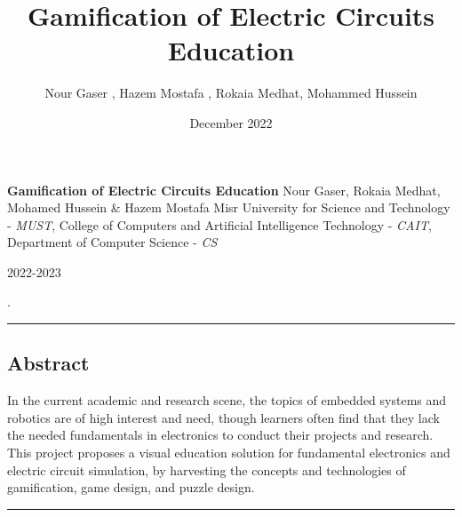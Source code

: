\documentclass[twoside,a4paper,11pt]{article}
\title{Gamification of Electric
 Circuits Education}
\author{Nour Gaser , Hazem Mostafa , Rokaia Medhat, Mohammed Hussein  }
\date{December 2022}
\begin{document}
\begin{center}
\LARGE
\textbf{Gamification of Electric Circuits Education}
\newline
\hfill \break
\large
Nour Gaser, Rokaia Medhat, Mohamed Hussein \& Hazem Mostafa
 \newline
\hfill \break
\normalsize
Misr University for Science and Technology -\textit{ MUST}, College of Computers and Artificial Intelligence Technology - \textit{CAIT}, Department of Computer Science - \textit{CS}

\hfill \break
\normalsize
\large 2022-2023   
\end{center}
\pagestyle{fancy}
\setlength{\headheight}{1.5cm}.

\centering
\hrule
\subsection*{Abstract} 
\footnotesize
\centering
In the current academic and research scene, the topics of embedded systems and robotics are of high interest and need, though learners often find that they lack the needed fundamentals in electronics to conduct their projects and research. This project proposes a visual education solution for fundamental electronics and electric circuit simulation, by harvesting the concepts and technologies of gamification, game design, and puzzle design. 

\hfill \break
\hrule
\end{document}
